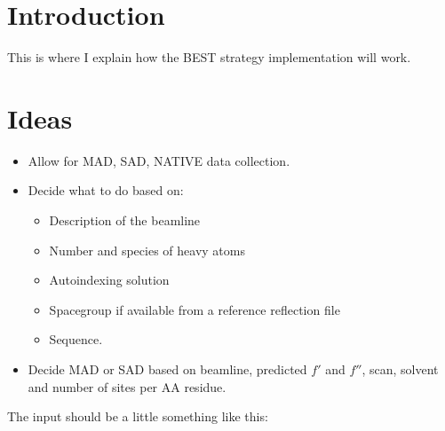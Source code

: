 \documentclass[a4paper, 11pt]{article}
\begin{document}
\section{Introduction}

This is where I explain how the BEST strategy implementation will work.

\section{Ideas}

\begin{itemize}

\item{Allow for MAD, SAD, NATIVE data collection.}

\item{Decide what to do based on:
\begin{itemize}
\item{Description of the beamline}
\item{Number and species of heavy atoms}
\item{Autoindexing solution}
\item{Spacegroup if available from a reference reflection file}
\item{Sequence.}
\end{itemize}
}

\item{Decide MAD or SAD based on beamline, predicted $f'$ and $f''$, scan,
solvent and number of sites per AA residue.}

\end{itemize}

The input should be a little something like this:
\end{document}

